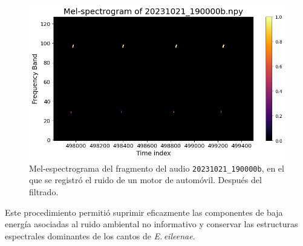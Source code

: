 \begin{figure}[ht]
    \centering
    \includegraphics[width=\columnwidth]{Graphics/car_noise_after.png}
    \caption{Mel-espectrograma del fragmento del audio \texttt{20231021\_190000b}, en el que se registró el ruido de un motor de automóvil. Después del filtrado.}
    \label{fig:car2}
\end{figure}

Este procedimiento permitió suprimir eficazmente las 
componentes de baja energía asociadas al ruido ambiental no 
informativo y conservar las estructuras espectrales dominantes 
de los cantos de \emph{E.\,eileenae}.










